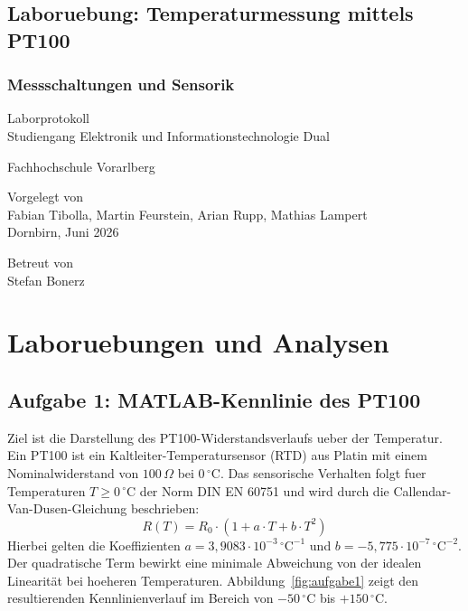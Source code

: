 \documentclass[a4paper,12pt,twoside]{scrreprt}
\begin{document}
\begin{titlepage}
  \begin{flushleft}
  \vspace{0.5cm}
  \section*{Laboruebung: Temperaturmessung mittels PT100}
  \subsection*{Messschaltungen und Sensorik}
  \vspace{1cm}

  Laborprotokoll\\
  Studiengang Elektronik und Informationstechnologie Dual
  \vspace{1.5cm}

  Fachhochschule Vorarlberg

  \vspace{2cm}

  Vorgelegt von\\
  Fabian Tibolla, Martin Feurstein, Arian Rupp, Mathias Lampert\\
  Dornbirn, Juni 2026
  
  \vspace{3cm}
  
  Betreut von\\
  Stefan Bonerz
  
  \end{flushleft}
\end{titlepage}

\tableofcontents
\newpage

{}
\listoffigures
\newpage

\chapter{Laboruebungen und Analysen}

\section{Aufgabe 1: MATLAB-Kennlinie des PT100}
Ziel ist die Darstellung des PT100-Widerstandsverlaufs ueber der Temperatur. Ein PT100 ist ein Kaltleiter-Temperatursensor (RTD) aus Platin mit einem Nominalwiderstand von $100\,\Omega$ bei $0\,^{\circ}\text{C}$. Das sensorische Verhalten folgt fuer Temperaturen $T \ge 0\,^{\circ}\text{C}$ der Norm DIN EN 60751 und wird durch die Callendar-Van-Dusen-Gleichung beschrieben:
\begin{equation}
R(T) = R_{0} \cdot (1 + a \cdot T + b \cdot T^2)
\end{equation}
Hierbei gelten die Koeffizienten $a = 3,9083 \cdot 10^{-3}\,^{\circ}\text{C}^{-1}$ und $b = -5,775 \cdot 10^{-7}\,^{\circ}\text{C}^{-2}$. Der quadratische Term bewirkt eine minimale Abweichung von der idealen Linearität bei hoeheren Temperaturen. Abbildung~\ref{fig:aufgabe1} zeigt den resultierenden Kennlinienverlauf im Bereich von $-50\,^{\circ}\text{C}$ bis $+150\,^{\circ}\text{C}$.
\end{document}
